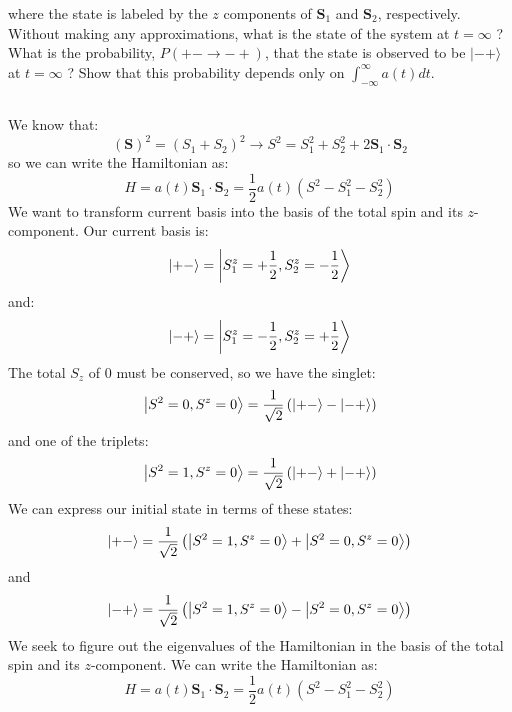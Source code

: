 \documentclass[12pt]{article}
\begin{document}
where the state is labeled by the $z$ components of $\mathbf{S}_{1}$ and $\mathbf{S}_{2}$, respectively. Without making any approximations, what is the state of the system at $t=\infty$ ? What is the probability, $P(+-\rightarrow-+)$, that the state is observed to be $|-+\rangle$ at $t=\infty$ ? Show that this probability depends only on $\int_{-\infty}^{\infty} a(t) d t$.
\subsection{}
We know that:
\begin{equation}
  (\mathbf{S})^2 = (S_1 + S_2)^2 \rightarrow S^2 = S_1^2 + S_2^2 + 2\mathbf{S}_1 \cdot \mathbf{S}_2
\end{equation}
so we can write the Hamiltonian as:
\begin{equation}
  H = a(t) \mathbf{S}_1 \cdot \mathbf{S}_2 = \frac{1}{2}a(t) \left(S^2 - S_1^2 - S_2^2\right) 
\end{equation}
We want to transform current basis into the basis of the total spin and its $z$-component. Our current basis is:
\begin{equation}
  \ket{+-} = \ket{S_1^z = +\frac{1}{2}, S_2^z = -\frac{1}{2}}
\end{equation}
and:
\begin{equation}
  \ket{-+} = \ket{S_1^z = -\frac{1}{2}, S_2^z = +\frac{1}{2}}
\end{equation}
The total $S_z$ of 0 must be conserved, so we have the singlet:
\begin{equation}
  \ket{S^2 = 0, S^z = 0} = \frac{1}{\sqrt{2}}\left(\ket{+-} - \ket{-+}\right)
\end{equation}
and one of the triplets:
\begin{equation}
  \ket{S^2 = 1, S^z = 0} = \frac{1}{\sqrt{2}}\left(\ket{+-} + \ket{-+}\right)
\end{equation}
We can express our initial state in terms of these states:
\begin{equation}
  \ket{+-} = \frac{1}{\sqrt{2}}\left(\ket{S^2 = 1, S^z = 0} + \ket{S^2 = 0, S^z = 0}\right)
\end{equation}
and
\begin{equation}
  \ket{-+} = \frac{1}{\sqrt{2}}\left(\ket{S^2 = 1, S^z = 0} - \ket{S^2 = 0, S^z = 0}\right)
\end{equation}
We seek to figure out the eigenvalues of the Hamiltonian in the basis of the total spin and its $z$-component. We can write the Hamiltonian as:
\begin{equation}
  H = a(t) \mathbf{S}_1 \cdot \mathbf{S}_2 = \frac{1}{2}a(t) \left(S^2 - S_1^2 - S_2^2\right)
\end{equation}
\end{document}
